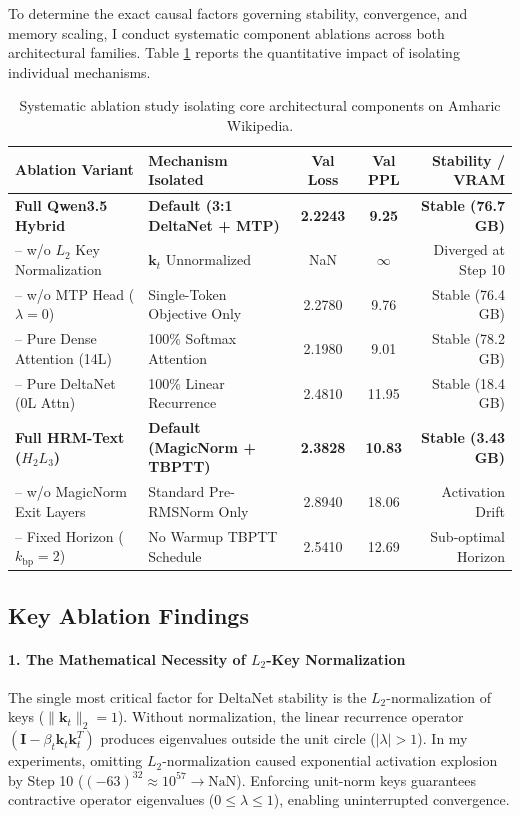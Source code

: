 \documentclass[11pt,a4paper]{article}
\begin{document}
To determine the exact causal factors governing stability, convergence, and memory scaling, I conduct systematic component ablations across both architectural families. Table \ref{tab:ablation_results} reports the quantitative impact of isolating individual mechanisms.

\begin{table}[t]
\centering
\small
\caption{Systematic ablation study isolating core architectural components on Amharic Wikipedia.}
\label{tab:ablation_results}
\begin{tabularx}{\textwidth}{p{4.4cm}Xccr}
\toprule
\textbf{Ablation Variant} & \textbf{Mechanism Isolated} & \textbf{Val Loss} & \textbf{Val PPL} & \textbf{Stability / VRAM} \\
\midrule
\textbf{Full Qwen3.5 Hybrid} & \textbf{Default (3:1 DeltaNet + MTP)} & \textbf{2.2243} & \textbf{9.25} & \textbf{Stable (76.7 GB)} \\
\quad-- w/o $L_2$ Key Normalization & $\mathbf{k}_t$ Unnormalized & NaN & $\infty$ & Diverged at Step 10 \\
\quad-- w/o MTP Head ($\lambda=0$) & Single-Token Objective Only & 2.2780 & 9.76 & Stable (76.4 GB) \\
\quad-- Pure Dense Attention (14L) & 100\% Softmax Attention & 2.1980 & 9.01 & Stable (78.2 GB) \\
\quad-- Pure DeltaNet (0L Attn) & 100\% Linear Recurrence & 2.4810 & 11.95 & Stable (18.4 GB) \\
\midrule
\textbf{Full HRM-Text ($H_2L_3$)} & \textbf{Default (MagicNorm + TBPTT)} & \textbf{2.3828} & \textbf{10.83} & \textbf{Stable (3.43 GB)} \\
\quad-- w/o MagicNorm Exit Layers & Standard Pre-RMSNorm Only & 2.8940 & 18.06 & Activation Drift \\
\quad-- Fixed Horizon ($k_{\text{bp}}=2$) & No Warmup TBPTT Schedule & 2.5410 & 12.69 & Sub-optimal Horizon \\
\bottomrule
\end{tabularx}
\end{table}

\subsection{Key Ablation Findings}

\paragraph{1. The Mathematical Necessity of $L_2$-Key Normalization}
The single most critical factor for DeltaNet stability is the $L_2$-normalization of keys ($\|\mathbf{k}_t\|_2 = 1$). Without normalization, the linear recurrence operator $(\mathbf{I} - \beta_t \mathbf{k}_t \mathbf{k}_t^T)$ produces eigenvalues outside the unit circle ($|\lambda| > 1$). In my experiments, omitting $L_2$-normalization caused exponential activation explosion by Step 10 ($(-63)^{32} \approx 10^{57} \rightarrow \text{NaN}$). Enforcing unit-norm keys guarantees contractive operator eigenvalues ($0 \le \lambda \le 1$), enabling uninterrupted convergence.
\end{document}
